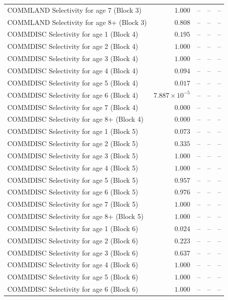 \documentclass[
]{article}
\begin{document}
\begin{landscape}
\begin{longtable}[t]{lrrrr}
COMMLAND Selectivity for age 7 (Block 3) & $1.000$ & -- & -- & --\\
COMMLAND Selectivity for age 8+ (Block 3) & $0.808$ & -- & -- & --\\
\addlinespace
COMMDISC Selectivity for age 1 (Block 4) & $0.195$ & -- & -- & --\\
COMMDISC Selectivity for age 2 (Block 4) & $1.000$ & -- & -- & --\\
COMMDISC Selectivity for age 3 (Block 4) & $1.000$ & -- & -- & --\\
COMMDISC Selectivity for age 4 (Block 4) & $0.094$ & -- & -- & --\\
COMMDISC Selectivity for age 5 (Block 4) & $0.017$ & -- & -- & --\\
\addlinespace
COMMDISC Selectivity for age 6 (Block 4) & $7.887\times 10^{-5}$ & -- & -- & --\\
COMMDISC Selectivity for age 7 (Block 4) & $0.000$ & -- & -- & --\\
COMMDISC Selectivity for age 8+ (Block 4) & $0.000$ & -- & -- & --\\
COMMDISC Selectivity for age 1 (Block 5) & $0.073$ & -- & -- & --\\
COMMDISC Selectivity for age 2 (Block 5) & $0.335$ & -- & -- & --\\
\addlinespace
COMMDISC Selectivity for age 3 (Block 5) & $1.000$ & -- & -- & --\\
COMMDISC Selectivity for age 4 (Block 5) & $1.000$ & -- & -- & --\\
COMMDISC Selectivity for age 5 (Block 5) & $0.957$ & -- & -- & --\\
COMMDISC Selectivity for age 6 (Block 5) & $0.976$ & -- & -- & --\\
COMMDISC Selectivity for age 7 (Block 5) & $1.000$ & -- & -- & --\\
\addlinespace
COMMDISC Selectivity for age 8+ (Block 5) & $1.000$ & -- & -- & --\\
COMMDISC Selectivity for age 1 (Block 6) & $0.024$ & -- & -- & --\\
COMMDISC Selectivity for age 2 (Block 6) & $0.223$ & -- & -- & --\\
COMMDISC Selectivity for age 3 (Block 6) & $0.637$ & -- & -- & --\\
COMMDISC Selectivity for age 4 (Block 6) & $1.000$ & -- & -- & --\\
\addlinespace
COMMDISC Selectivity for age 5 (Block 6) & $1.000$ & -- & -- & --\\
COMMDISC Selectivity for age 6 (Block 6) & $1.000$ & -- & -- & --\\

\end{longtable}
\end{landscape}
\end{document}
